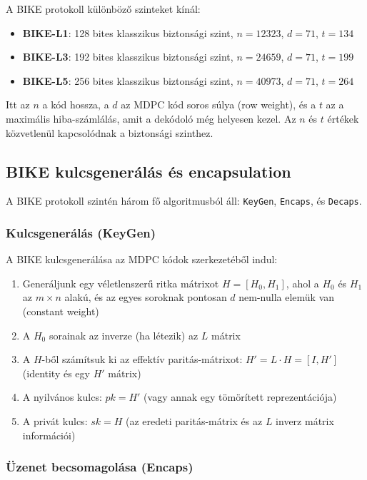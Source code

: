 A BIKE protokoll különböző szinteket kínál:

\begin{itemize}
    \item \textbf{BIKE-L1}: 128 bites klasszikus biztonsági szint, $n = 12323$, $d = 71$, $t = 134$
    \item \textbf{BIKE-L3}: 192 bites klasszikus biztonsági szint, $n = 24659$, $d = 71$, $t = 199$
    \item \textbf{BIKE-L5}: 256 bites klasszikus biztonsági szint, $n = 40973$, $d = 71$, $t = 264$
\end{itemize}

Itt az $n$ a kód hossza, a $d$ az MDPC kód soros súlya (row weight), és a $t$ az 
a maximális hiba-számlálás, amit a dekódoló még helyesen kezel. Az $n$ és $t$ értékek 
közvetlenül kapcsolódnak a biztonsági szinthez.

\subsection{BIKE kulcsgenerálás és encapsulation}

A BIKE protokoll szintén három fő algoritmusból áll: \texttt{KeyGen}, \texttt{Encaps}, és \texttt{Decaps}.

\subsubsection{Kulcsgenerálás (KeyGen)}

A BIKE kulcsgenerálása az MDPC kódok szerkezetéből indul:

\begin{enumerate}
    \item Generáljunk egy véletlenszerű ritka mátrixot $H = [H_0, H_1]$, ahol a
        $H_0$ és $H_1$ az $m \times n$ alakú, és az egyes soroknak pontosan $d$ nem-nulla 
        elemük van (constant weight)
    \item A $H_0$ sorainak az inverze (ha létezik) az $L$ mátrix
    \item A $H$-ből számítsuk ki az effektív paritás-mátrixot: 
        $H' = L \cdot H = [I, H']$ (identity és egy $H'$ mátrix)
    \item A nyilvános kulcs: $pk = H'$ (vagy annak egy tömörített reprezentációja)
    \item A privát kulcs: $sk = H$ (az eredeti paritás-mátrix és az $L$ inverz mátrix információi)
\end{enumerate}

\subsubsection{Üzenet becsomagolása (Encaps)}


